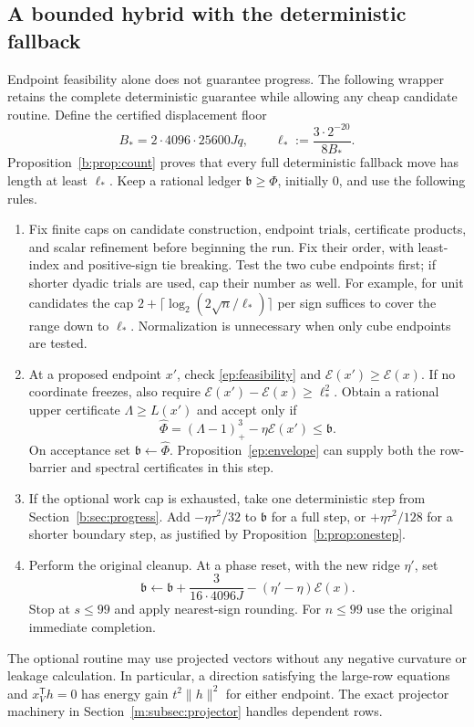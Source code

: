 \documentclass[11pt]{amsart}
\theoremstyle{definition}\newtheorem{definition}[theorem]{Definition}
\theoremstyle{remark}\newtheorem{remark}[theorem]{Remark}
\numberwithin{equation}{section}
\newcommand{\T}{\mathsf T}
\begin{document}
\subsection{A bounded hybrid with the deterministic fallback}
\label{ep:hybrid}
Endpoint feasibility alone does not guarantee progress. The following
wrapper retains the complete deterministic guarantee while allowing any
cheap candidate routine. Define the certified displacement floor
\begin{equation}\label{ep:floor}
 B_*=2\cdot4096\cdot25600Jq,\qquad
 \ell_*:=\frac{3\cdot2^{-20}}{8B_*}.
\end{equation}
Proposition~\ref{b:prop:count} proves that every full deterministic
fallback move has length at least $\ell_*$. Keep a rational ledger
$\mathfrak b\ge\Phi$, initially $0$, and use the following rules.
\begin{enumerate}
\item Fix finite caps on candidate construction, endpoint trials,
certificate products, and scalar refinement before beginning the run.
Fix their order, with least-index and positive-sign tie breaking.
Test the two cube endpoints first; if shorter dyadic trials are used,
cap their number as well. For example, for unit candidates the cap
$2+\lceil\log_2(2\sqrt n/\ell_*)\rceil$ per sign suffices to cover
the range down to $\ell_*$. Normalization is unnecessary when only
cube endpoints are tested.
\item At a proposed endpoint $x'$, check \eqref{ep:feasibility} and
$\mathcal E(x')\ge\mathcal E(x)$. If no coordinate freezes, also
require $\mathcal E(x')-\mathcal E(x)\ge\ell_*^2$.
Obtain a rational upper certificate $\Lambda\ge L(x')$ and accept only if
\begin{equation}\label{ep:ledger}
 \widehat\Phi=(\Lambda-1)_+^3-\eta\mathcal E(x')\le\mathfrak b.
\end{equation}
On acceptance set $\mathfrak b\leftarrow\widehat\Phi$.
Proposition~\ref{ep:envelope} can supply both the row-barrier and
spectral certificates in this step.
\item If the optional work cap is exhausted, take one deterministic
step from Section~\ref{b:sec:progress}. Add $-\eta\tau^2/32$ to
$\mathfrak b$ for a full step, or $+\eta\tau^2/128$ for a shorter
boundary step, as justified by Proposition~\ref{b:prop:onestep}.
\item Perform the original cleanup. At a phase reset, with the new
ridge $\eta'$, set
\begin{equation}\label{ep:reset}
 \mathfrak b\leftarrow\mathfrak b+
     \frac{3}{16\cdot4096J}-(\eta'-\eta)\mathcal E(x).
\end{equation}
Stop at $s\le99$ and apply nearest-sign rounding. For $n\le99$ use
the original immediate completion.
\end{enumerate}
The optional routine may use projected vectors without any negative
curvature or leakage calculation. In particular, a direction satisfying
the large-row equations and $x_V^\T h=0$ has energy gain
$t^2\|h\|^2$ for either endpoint. The exact projector machinery in
Section~\ref{m:subsec:projector} handles dependent rows.
\end{document}
